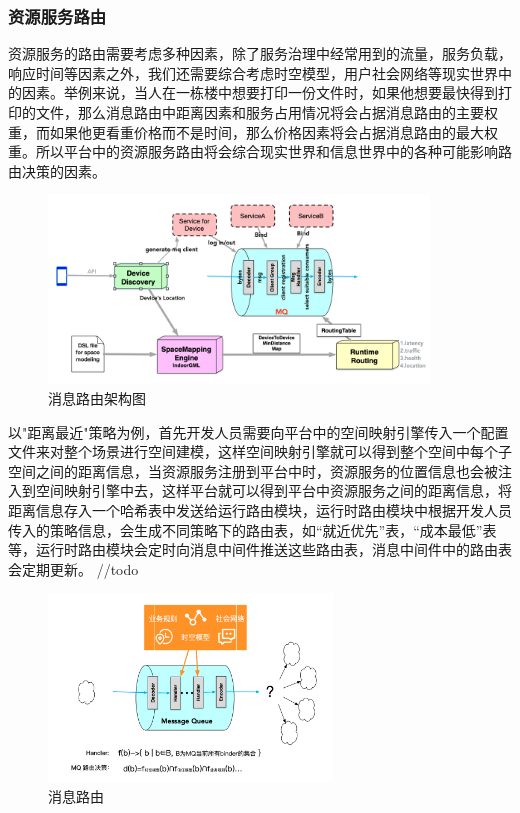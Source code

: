 \documentclass[a4paper, 12pt]{article}
\theoremstyle{definition}
\begin{document}
\subsubsection{资源服务路由}
资源服务的路由需要考虑多种因素，除了服务治理中经常用到的流量，服务负载，响应时间等因素之外，我们还需要综合考虑时空模型，用户社会网络等现实世界中的因素。举例来说，当人在一栋楼中想要打印一份文件时，如果他想要最快得到打印的文件，那么消息路由中距离因素和服务占用情况将会占据消息路由的主要权重，而如果他更看重价格而不是时间，那么价格因素将会占据消息路由的最大权重。所以平台中的资源服务路由将会综合现实世界和信息世界中的各种可能影响路由决策的因素。
\begin{figure}[ht]
 \centering
 \includegraphics[height=5cm]{images/routing_1.png}
 \caption{消息路由架构图}
 \label{fig:singleblock}
\end{figure}
以"距离最近"策略为例，首先开发人员需要向平台中的空间映射引擎传入一个配置文件来对整个场景进行空间建模，这样空间映射引擎就可以得到整个空间中每个子空间之间的距离信息，当资源服务注册到平台中时，资源服务的位置信息也会被注入到空间映射引擎中去，这样平台就可以得到平台中资源服务之间的距离信息，将距离信息存入一个哈希表中发送给运行路由模块，运行时路由模块中根据开发人员传入的策略信息，会生成不同策略下的路由表，如“就近优先”表，“成本最低”表等，运行时路由模块会定时向消息中间件推送这些路由表，消息中间件中的路由表会定期更新。
//todo
\begin{figure}[ht]
 \centering
 \includegraphics[height=5cm]{images/routing.png}
 \caption{消息路由}
 \label{fig:singleblock}
\end{figure}
\end{document}
